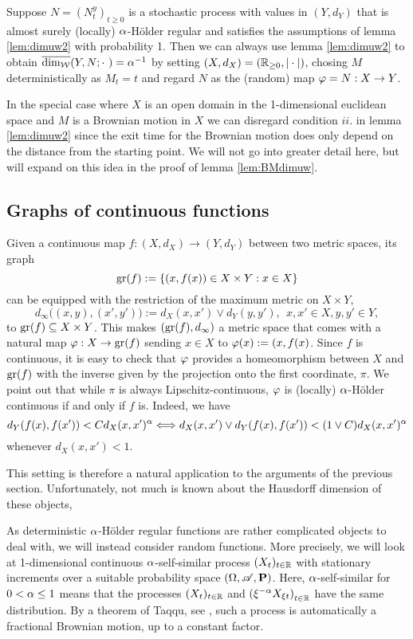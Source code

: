 \begin{rem} 
  Suppose $N=\left(N_t^y\right)_{t\geq0}$ is a stochastic process with values in $(Y,d_Y)$ that is almost surely (locally) $\alpha$-H\"older regular and satisfies the assumptions of lemma \ref{lem:dimuw2} with probability 1. Then we can always use lemma \ref{lem:dimuw2} to obtain
  $\overline{\dim_{\mathcal{W}}}(Y,N;\cdot\ )=\alpha^{-1}$ by setting 
  $(X,d_X)=(\mathbb{R}_{\geq0},|\cdot|)$, chosing $M$ deterministically as $M_t=t$ and regard $N$ as the (random) map $\varphi=N:X\to Y$.
\end{rem}
In the special case where $X$ is an open domain in the 1-dimensional euclidean space and $M$ is a Brownian motion in $X$ we can disregard condition $ii.$ in lemma \ref{lem:dimuw2} since the exit time for the Brownian motion does only depend on the distance from the starting point. We will not go into greater detail here, but will expand on this idea in the proof of lemma \ref{lem:BMdimuw}.

\newpage

\subsection{Graphs of continuous functions}

Given a continuous map $f:(X,d_X)\to (Y,d_Y)$ between two metric spaces, its graph
\[
  \operatorname{gr}(f):=\left\{(x,f(x))\in X\times Y:x\in X\right\}
\]
can be equipped with the restriction of the maximum metric on 
$X\times Y$,
\[
  d_\infty\big((x,y),(x',y')\big):=d_X(x,x')\vee d_Y(y,y'),\ \ 
  x,x'\in X, y,y'\in Y,
\]
to $\operatorname{gr}(f)\subseteq X\times Y$. This makes $(\operatorname{gr}(f),d_\infty)$ a metric space that comes with a natural map $\varphi:X\to\operatorname{gr}(f)$ sending $x\in X$ to 
$\varphi(x):=(x,f(x)$. Since $f$ is continuous, it is easy to check that 
$\varphi$ provides a homeomorphism between $X$ and $\operatorname{gr}(f)$ with the inverse given by the projection onto the first coordinate, $\pi$.
We point out that while $\pi$ is always Lipschitz-continuous, $\varphi$ is 
(locally) $\alpha$-H\"older continuous if and only if $f$ is. Indeed, we have 
\[
  d_Y(f(x),f(x'))<Cd_X(x,x')^\alpha \Longleftrightarrow
  d_X(x,x')\vee d_Y(f(x),f(x'))<(1\vee C)d_X(x,x')^\alpha
\]  
whenever $d_X(x,x')<1$. 

This setting is therefore a natural application to the arguments of the previous section. Unfortunately, not much is known about the Hausdorff dimension of these objects, 

As deterministic $\alpha$-H\"older regular functions are rather complicated objects to deal with, we will instead consider random functions. More precisely, we will look at 1-dimensional continuous $\alpha$-self-similar process $(X_t)_{t\in\mathbb{R}}$ with stationary increments over a suitable probability space $(\Omega,\mathscr{A},\mathbf{P})$. Here, $\alpha$-self-similar for 
$0<\alpha\leq1$ means that the processes $(X_t)_{t\in\mathbb{R}}$ and 
$\left(\xi^{-\alpha}X_{\xi t}\right)_{t\in\mathbb{R}}$ have the same distribution. By a theorem of Taqqu, see \cite[Thm1.3.1]{embrechts2002selfsimilar}, such a process is automatically a fractional Brownian motion, up to a constant factor. 

